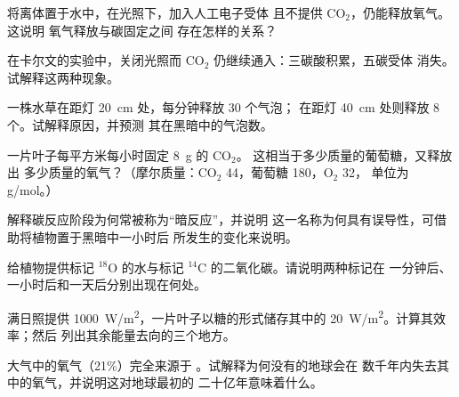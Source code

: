 \begin{exercise}[$\star\star$]\label{exo:g12:photosynthesis:8}
将离体置于水中，在光照下，加入人工电子受体
且不提供 $\mathrm{CO_2}$，仍能释放氧气。这说明
氧气释放与碳固定之间
存在怎样的关系？
\end{exercise}

\begin{exercise}[$\star\star$]\label{exo:g12:photosynthesis:9}
在卡尔文的实验中，关闭光照而 $\mathrm{CO_2}$
仍继续通入：三碳酸积累，五碳受体
消失。试解释这两种现象。
\end{exercise}

\begin{exercise}[$\star\star$]\label{exo:g12:photosynthesis:10}
一株水草在距灯 \qty{20}{cm} 处，每分钟释放 30 个气泡；
在距灯 \qty{40}{cm} 处则释放 8 个。试解释原因，并预测
其在黑暗中的气泡数。
\end{exercise}

\begin{exercise}[$\star\star$]\label{exo:g12:photosynthesis:11}
一片叶子每平方米每小时固定 \qty{8}{g} 的 $\mathrm{CO_2}$。
这相当于多少质量的葡萄糖，又释放出
多少质量的氧气？（摩尔质量：$\mathrm{CO_2}$ 44，葡萄糖 180，$\mathrm{O_2}$ 32，
单位为 \unit{g/mol}。）
\end{exercise}

\begin{exercise}[$\star\star\star$]\label{exo:g12:photosynthesis:12}
解释碳反应阶段为何常被称为“暗反应”，并说明
这一名称为何具有误导性，可借助将植物置于黑暗中一小时后
所发生的变化来说明。
\end{exercise}

\begin{exercise}[$\star\star\star$]\label{exo:g12:photosynthesis:13}
给植物提供标记 $^{18}$O 的水与标记
$^{14}$C 的二氧化碳。请说明两种标记在
一分钟后、一小时后和一天后分别出现在何处。
\end{exercise}

\begin{exercise}[$\star\star\star$]\label{exo:g12:photosynthesis:14}
满日照提供 \qty{1000}{W/m^2}，一片叶子以糖的形式储存其中的
\qty{20}{W/m^2}。计算其效率；然后
列出其余能量去向的三个地方。
\end{exercise}

\begin{exercise}[$\star\star\star$]\label{exo:g12:photosynthesis:15}
大气中的氧气（21\%）完全来源于
。试解释为何没有的地球会在
数千年内失去其中的氧气，并说明这对地球最初的
二十亿年意味着什么。
\end{exercise}

